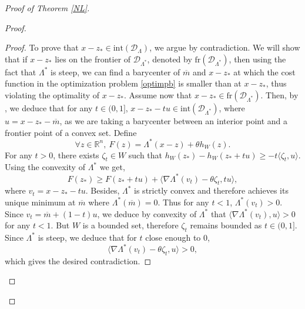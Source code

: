 \documentclass[aop,preprint]{imsart}
\newcommand\RR{\mathbb{R}}
\numberwithin{equation}{section}
\theoremstyle{definition}
\theoremstyle{plain}
\theoremstyle{remark}
\begin{document}
\begin{proof}[Proof of Theorem \ref{NL}]
\begin{proof}
\begin{proof}
To prove that $x-z_* \in \mathrm{int}(\mathcal{D}_\Lambda)$, we argue by contradiction. We will show that if $x-z_*$ lies on the frontier of $\mathcal{D}_{\Lambda^*}$, denoted by $\mathrm{fr}(\mathcal{D}_{\Lambda^*})$, then using the fact that $\Lambda^*$ is steep, we can find a barycenter of $\overline{m}$ and $x-z_*$ at which the cost function in the optimization problem \eqref{optimpb} is smaller than at $x-z_*$, thus violating the optimality of $x-z_*$. Assume now that $x-z_*\in \mathrm{fr}( \mathcal{D}_{\Lambda^*})$. Then, by \cite[Theorem 6.1]{Rockafeller}, we deduce that for any $t\in (0,1]$, $x-z_* - tu \in \mathrm{int}(\mathcal{D}_{\Lambda^*})$, where $ u = x-z_* -\overline{m}$, as we are taking a barycenter between an interior point and a frontier point of a convex set. Define
\begin{equation}\label{defF}\forall z \in \RR^n, \  F(z) = \Lambda^*(x-z) + \theta h_W(z).\end{equation}
For any $t>0$, there exists $\zeta_t \in  W$ such that $h_W(z_*) -h_W(z_*+tu) \geq -t \langle \zeta_t, u\rangle$. Using the convexity of $\Lambda^*$ we get, 
$$ F(z_*) \geq F(z_*+tu) + \langle  \nabla \Lambda^*(v_t) -\theta \zeta_t, t u\rangle,$$
where $v_t = x-z_*-tu$. Besides, $\Lambda^*$ is strictly convex and therefore achieves its unique minimum at $\overline{m}$ where $\Lambda^*(\overline{m})=0$. Thus for any $t<1$, $\Lambda^*(v_t)>0$. Since $v_t = \overline{m}+(1-t)u$, we deduce by convexity of $\Lambda^*$ that $\langle \nabla \Lambda^*(v_t) , u\rangle>0$ for any $t<1$. But $W$ is a bounded set, therefore $\zeta_t$ remains bounded as $t \in(0,1]$. Since $\Lambda^*$ is steep, we deduce that for $t$ close enough to $0$, 
$$ \langle \nabla \Lambda^*(v_t)  -\theta \zeta_t,  u\rangle>0,$$
which gives the desired contradiction.
\end{proof}



\end{proof}
\end{proof}
\end{document}
